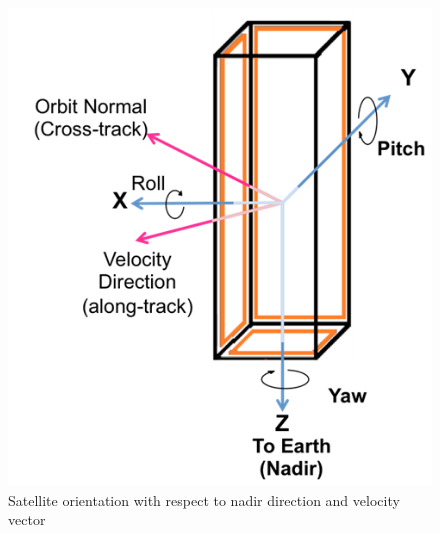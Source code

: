 \documentclass[12pt]{article}
\begin{document}
			\begin{figure}[!h]
				\centering
				\includegraphics[scale=0.7]{images/ADCS_coord.png}
				\caption{Satellite orientation with respect to nadir direction and velocity vector}
				\label{fig:ADCS_orientation}
			\end{figure}
				
\end{document}
